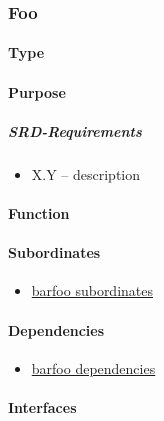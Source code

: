 \subsubsection{Foo} %
\label{component:foo}

\paragraph{Type} %
\label{par:type}


\paragraph{Purpose} %
\label{par:purpose}
\subparagraph{SRD-Requirements}
  \begin{itemize}
    \item X.Y -- description
  \end{itemize}

\paragraph{Function} %
\label{par:function}


\paragraph{Subordinates} %
\label{par:subordinates}
\begin{itemize}
	\item \hyperref[component:subord]{barfoo subordinates}
\end{itemize}

\paragraph{Dependencies} %
\label{par:dependencies}
  \begin{itemize}
    \item \hyperref[component:dependencies]{barfoo dependencies}
  \end{itemize}


\paragraph{Interfaces} %
\label{par:interfaces}

